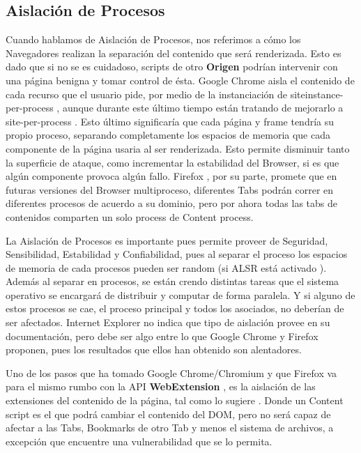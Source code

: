  \subsection{Aislación de Procesos}
    Cuando hablamos de Aislación de Procesos, nos referimos a cómo los Navegadores realizan la separación del contenido que será renderizada. Esto es dado que si no se es cuidadoso, scripts de otro \textbf{Origen} podrían intervenir con una página benigna y tomar control de ésta. Google Chrome aisla el contenido de cada recurso que el usuario pide, por medio de la instanciación de siteinstance-per-process \cite{Reis2009}, aunque durante este último tiempo están tratando de mejorarlo a site-per-process \cite{GoogleChromeIsolation}. Esto último significaría que cada página y frame tendría su propio proceso, separando completamente los espacios de memoria que cada componente de la página usaria al ser renderizada. Esto permite disminuir tanto la superficie de ataque, como incrementar la estabilidad del Browser, si es que algún componente provoca algún fallo. Firefox \cite{FirefoxThreatModel}, por su parte, promete que en futuras versiones del Browser multiproceso, diferentes Tabs podrán correr en diferentes procesos de acuerdo a su dominio, pero por ahora todas las tabs de contenidos comparten un solo process de Content process.

    La Aislación de Procesos es importante pues permite proveer de Seguridad, Sensibilidad, Estabilidad y Confiabilidad, pues al separar el proceso los espacios de memoria de cada procesos pueden ser random (si ALSR está activado \cite{Drake2011}). Además al separar en procesos, se están crendo distintas tareas que el sistema operativo se encargará de distribuir y computar de forma paralela. Y si alguno de estos procesos se cae, el proceso principal y todos los asociados, no deberían de ser afectados. Internet Explorer no indica que tipo de aislación provee en su documentación, pero debe ser algo entre lo que Google Chrome y Firefox proponen, pues los resultados que ellos han obtenido son alentadores.
    
    Uno de los pasos que ha tomado Google Chrome/Chromium y que Firefox va para el mismo rumbo con la API \textbf{WebExtension} \cite{AddONFirefox}, es la aislación de las extensiones del contenido de la página, tal como lo sugiere \cite{Barth2010}. Donde un Content script es el que podrá cambiar el contenido del DOM, pero no será capaz de afectar a las Tabs, Bookmarks de otro Tab y menos el sistema de archivos, a excepción que encuentre una vulnerabilidad que se lo permita.
    
